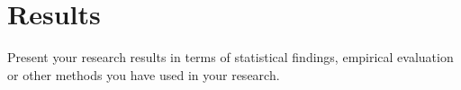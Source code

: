 \chapter{Results}
\label{ch:results}

Present your research results in terms of statistical findings,
empirical evaluation or other methods you have used in your research.

